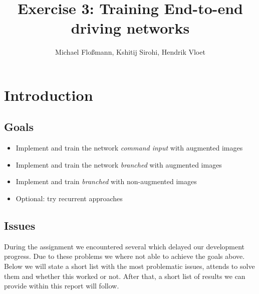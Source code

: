 \documentclass[a4paper]{article}
\title{Exercise 3: Training End-to-end driving networks}
\author{Michael Floßmann, Kshitij Sirohi, Hendrik Vloet}
\begin{document}
\maketitle

\section{Introduction}
\subsection{Goals}

\begin{itemize}
	\item Implement and train the network \textit{command input} with augmented images
	\item Implement and train the network \textit{branched} with augmented images
	\item Implement and train \textit{branched} with non-augmented images
	\item Optional: try recurrent approaches
\end{itemize}

\subsection{Issues}

During the assignment we encountered several which delayed our development progress. Due to these problems we where not able to achieve the goals above. Below we will state a short list with the most problematic issues, attends to solve them and whether this worked or not. After that, a short list of results we can provide within this report will follow.
\end{document}
